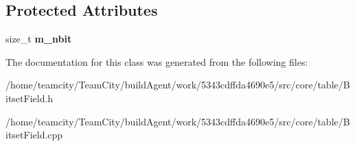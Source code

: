 \subsection*{Protected Attributes}
\begin{DoxyCompactItemize}
\item 
size\+\_\+t {\bfseries m\+\_\+nbit}\hypertarget{classBitsetField_aa93dab557a478225c412d7aa0683396b}{}\label{classBitsetField_aa93dab557a478225c412d7aa0683396b}

\end{DoxyCompactItemize}


The documentation for this class was generated from the following files\+:\begin{DoxyCompactItemize}
\item 
/home/teamcity/\+Team\+City/build\+Agent/work/5343cdffda4690e5/src/core/table/Bitset\+Field.\+h\item 
/home/teamcity/\+Team\+City/build\+Agent/work/5343cdffda4690e5/src/core/table/Bitset\+Field.\+cpp\end{DoxyCompactItemize}
